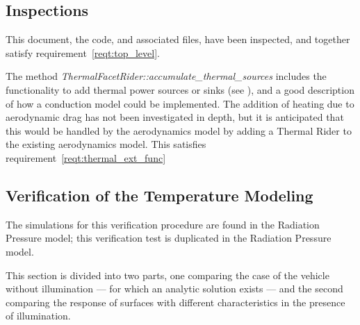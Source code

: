 %
%
% 
%


\subsection{Inspections}

\label{inspect:top_level}
This document, the code, and associated files, have been inspected, and together
satisfy requirement~\ref{reqt:top_level}.

 \label{inspect:thermal_ext_func}
The method \textit{ThermalFacetRider::accumulate\_thermal\_sources} includes the
functionality to add thermal power sources or sinks (see ), and a good description of how a conduction model could be implemented.  The addition of heating due to aerodynamic drag has not been investigated in depth, but it is anticipated that this would be handled by the aerodynamics model by adding a Thermal Rider to the existing aerodynamics model.  This satisfies requirement~\ref{reqt:thermal_ext_func}



\subsection{Verification of the Temperature Modeling}
\label{test:temperature}

  The simulations for this verification procedure are found in the Radiation Pressure model; this verification test is duplicated in the Radiation Pressure model.
  
  This section is divided into two parts, one comparing the case of
  the vehicle without illumination --- for which an analytic solution
  exists --- and the second comparing the response of surfaces with different
  characteristics in the presence of illumination.

